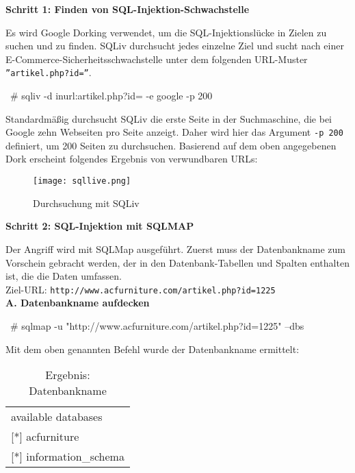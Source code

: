 \textbf{Schritt 1: Finden von SQL-Injektion-Schwachstelle}

Es wird Google Dorking verwendet, um die SQL-Injektionslücke in Zielen zu suchen und zu finden. SQLiv durchsucht jedes einzelne Ziel und sucht nach einer E-Commerce-Sicherheitsschwachstelle unter dem folgenden URL-Muster \texttt{''artikel.php?id=''}.\\

\begin{LaTeXCode}[caption={Google Dorking mit SQLiv \cite{ramadhan17sqlinj}},captionpos=b, label=LaTeXCode:gdsqliv][numbers=none]
~# sqliv -d inurl:artikel.php?id= -e google -p 200
\end{LaTeXCode}

Standardmäßig durchsucht SQLiv die erste Seite in der Suchmaschine, die bei Google zehn Webseiten pro Seite anzeigt. Daher wird hier das Argument \texttt{-p 200} definiert, um 200 Seiten zu durchsuchen. Basierend auf dem oben angegebenen Dork erscheint folgendes Ergebnis von verwundbaren URLs:

\newpage

\begin{figure}[h]
	\centering
	\texttt{[image: sqllive.png]}
	\caption{Durchsuchung mit SQLiv}
\end{figure}



\textbf{Schritt 2: SQL-Injektion mit SQLMAP}

Der Angriff wird mit SQLMap ausgeführt. Zuerst muss der Datenbankname zum Vorschein gebracht werden, der in den Datenbank-Tabellen und Spalten enthalten ist, die die Daten umfassen.\\

Ziel-URL: \texttt{http://www.acfurniture.com/artikel.php?id=1225}\\

\textbf{A. Datenbankname aufdecken}\\

\begin{LaTeXCode}[caption={Aufdeckung des Datenbanknames\cite{ramadhan17sqlinj}},captionpos=b, label=LaTeXCode:advd1][numbers=none]
~# sqlmap -u "http://www.acfurniture.com/artikel.php?id=1225" --dbs
\end{LaTeXCode}

Mit dem oben genannten Befehl wurde der Datenbankname ermittelt:

\begin{table}[h]
	\centering
	\begin{tabular}{l}
		available databases         \\
		{[}*{]} acfurniture         \\
		{[}*{]} information\_schema
	\end{tabular}
	\caption{Ergebnis: Datenbankname}
\end{table}

